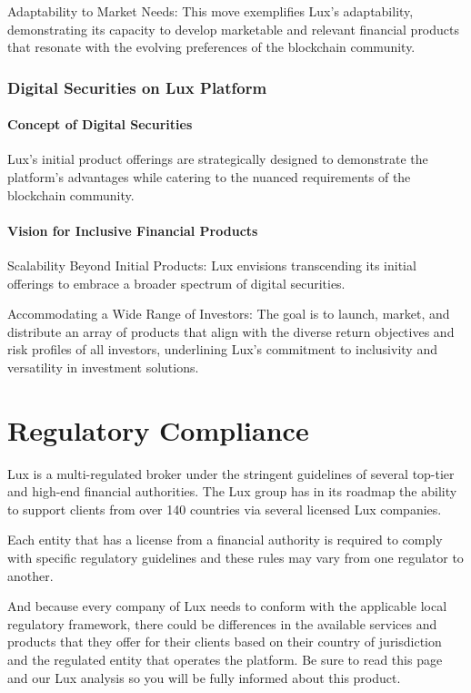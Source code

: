\documentclass[11pt]{article}
\begin{document}
Adaptability to Market Needs: This move exemplifies Lux's adaptability, demonstrating its capacity to develop marketable and relevant financial products that resonate with the evolving preferences of the blockchain community.


\subsubsection{Digital Securities on Lux Platform}

\paragraph{Concept of Digital Securities}

Lux's initial product offerings are strategically designed to demonstrate the platform's advantages while catering to the nuanced requirements of the blockchain community.


\paragraph{Vision for Inclusive Financial Products}

Scalability Beyond Initial Products: Lux envisions transcending its initial offerings to embrace a broader spectrum of digital securities.


Accommodating a Wide Range of Investors: The goal is to launch, market, and distribute an array of products that align with the diverse return objectives and risk profiles of all investors, underlining Lux's commitment to inclusivity and versatility in investment solutions.


\section{Regulatory Compliance}

Lux is a multi-regulated broker under the stringent guidelines of several top-tier and high-end financial authorities. The Lux group has in its roadmap the ability to support clients from over 140 countries via several licensed Lux companies.


Each entity that has a license from a financial authority is required to comply with specific regulatory guidelines and these rules may vary from one regulator to another.


And because every company of Lux needs to conform with the applicable local regulatory framework, there could be differences in the available services and products that they offer for their clients based on their country of jurisdiction and the regulated entity that operates the platform. Be sure to read this page and our Lux analysis so you will be fully informed about this product.
\end{document}
